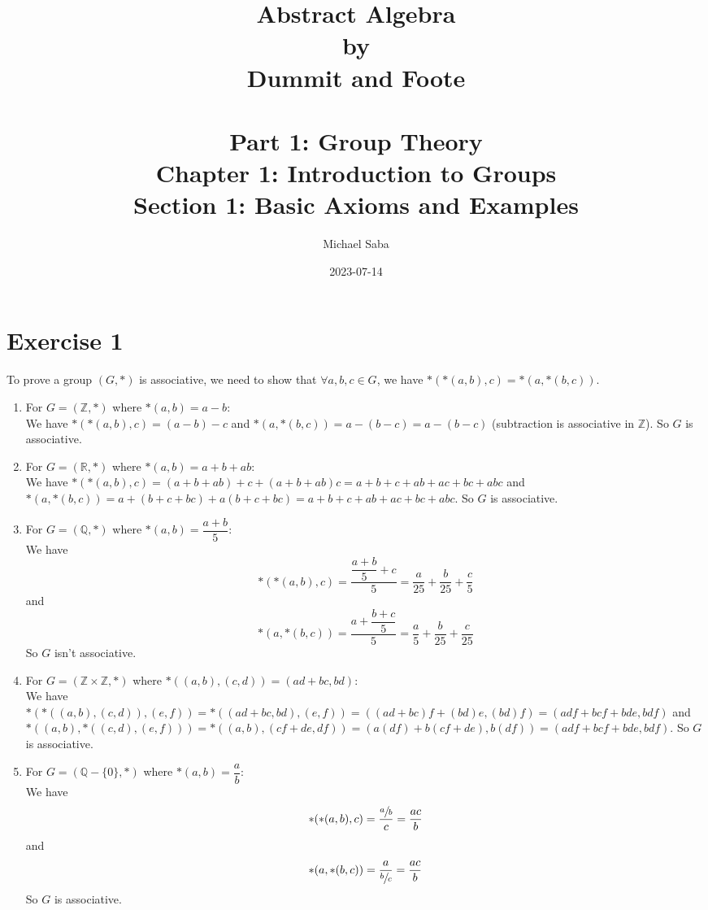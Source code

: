 \documentclass{article}
\title{%
    \Huge Abstract Algebra \\
    \large by \\
    \Large Dummit and Foote \\~\\
    \huge Part 1: Group Theory \\
    \LARGE Chapter 1: Introduction to Groups \\
    \Large Section 1: Basic Axioms and Examples
}
\date{2023-07-14}
\author{Michael Saba}
\newcommand{\Z}{\mathbb{Z}}
\newcommand{\Q}{\mathbb{Q}}
\newcommand{\R}{\mathbb{R}}
\begin{document}
    \maketitle
    \newpage


    \section*{Exercise 1}
    To prove a group $(G, \ast)$ is associative,
    we need to show that $ \forall a, b, c \in G$,
    we have $\ast(\ast(a, b), c) = \ast(a, \ast(b, c))$.
    \begin{enumerate}[label=\textbf{\alph*.}]
        \item
            For $G = (\Z, \ast)$ where $\ast(a, b) = a - b$: \\
            We have $\ast(\ast(a, b), c) = (a - b) - c$
            and $\ast(a, \ast(b, c)) = a - (b - c) = a - (b - c)$
            (subtraction is associative in $\Z$).
            So $G$ is associative. 
        \item
            For $G = (\R, \ast)$ where $\ast(a, b) = a + b + ab$: \\
            We have $\ast(\ast(a, b), c)
            = (a + b + ab) + c + (a + b + ab)c
            = a + b + c + ab + ac + bc + abc$
            and $\ast(a, \ast(b, c))
            = a + (b + c + bc) + a(b + c + bc)
            = a + b + c + ab + ac + bc + abc$.
            So $G$ is associative.
        \item
            For $G = (\Q, \ast)$ where $\ast(a, b) = \dfrac{a+b}{5}$: \\
            We have \[\ast(\ast(a, b), c)
            = \dfrac{\dfrac{a + b}{5} + c}{5}
            = \dfrac{a}{25} + \dfrac{b}{25} + \dfrac{c}{5}\]
            and \[\ast(a, \ast(b, c))
            = \dfrac{a + \dfrac{b + c}{5}}{5}
            = \dfrac{a}{5} + \dfrac{b}{25} + \dfrac{c}{25}\]
            So $G$ isn't associative.
        \item
            For $G = (\Z \times \Z, \ast)$
            where $\ast((a, b), (c, d)) = (ad + bc, bd)$: \\
            We have $\ast(\ast((a, b), (c, d)), (e, f)) 
            = \ast((ad + bc, bd), (e, f)) 
            = ((ad + bc)f + (bd)e, (bd)f) = (adf + bcf + bde, bdf)$
            and $\ast((a, b), \ast((c, d), (e, f)))
            = \ast((a, b), (cf + de, df)) 
            = (a(df) + b(cf + de), b(df)) 
            = (adf + bcf + bde, bdf)$.
            So $G$ is associative.
        \item
            For $G = (\Q - \{0\}, \ast)$ where $\ast(a, b) = \dfrac{a}{b}$: \\
            We have \[\ast(\ast(a, b), c)
            = \dfrac{\sfrac{a}{b}}{c} = \dfrac{ac}{b}\]
            and \[\ast(a, \ast(b, c))
            = \dfrac{a}{\sfrac{b}{c}} = \dfrac{ac}{b}\]
            So $G$ is associative.
    \end{enumerate}
   
\end{document}
